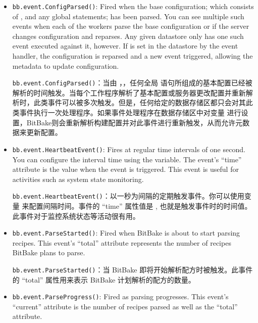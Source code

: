 \begin{itemize}
\setlength\itemsep{1.0em}
\item \texttt{bb.event.ConfigParsed()}: Fired when the base configuration; which consists of ,  and any global  statements; has been parsed. You can see multiple such events when each of the workers parse the base configuration or if the server changes configuration and reparses. Any given datastore only has one such event executed against it, however. If  is set in the datastore by the event handler, the configuration is reparsed and a new event triggered, allowing the metadata to update configuration.

\medskip
\texttt{bb.event.ConfigParsed()}：当由 ，，任何全局 语句所组成的基本配置已经被解析的时间触发。当每个工作程序解析了基本配置或服务器更改配置并重新解析时，此类事件可以被多次触发。但是，任何给定的数据存储区都只会对其此类事件执行一次处理程序。如果事件处理程序在数据存储区中对变量  进行设置，BitBake则会重新解析构建配置并对此事件进行重新触发，从而允许元数据来更新配置。

\item \texttt{bb.event.HeartbeatEvent()}: Fires at regular time intervals of one second. You can configure the interval time using the  variable. The event's ``time'' attribute is the  value when the event is triggered. This event is useful for activities such as system state monitoring.

\medskip
\texttt{bb.event.HeartbeatEvent()}：以一秒为间隔的定期触发事件。你可以使用变量   来配置间隔时间。事件的 ``time'' 属性值是 , 也就是触发事件时的时间值。此事件对于监控系统状态等活动很有用。

\item \texttt{bb.event.ParseStarted()}: Fired when BitBake is about to start parsing recipes. This event's ``total'' attribute represents the number of recipes BitBake plans to parse.

\medskip
\texttt{bb.event.ParseStarted()}：当 BitBake 即将开始解析配方时被触发。此事件的 ``total'' 属性用来表示 BitBake 计划解析的配方的数量。

\item \texttt{bb.event.ParseProgress()}: Fired as parsing progresses. This event's ``current'' attribute is the number of recipes parsed as well as the ``total'' attribute.


\end{itemize}
